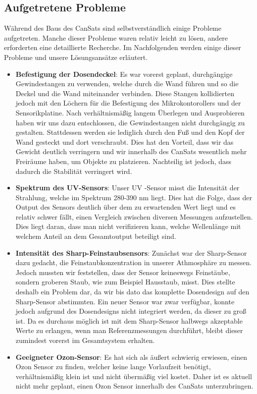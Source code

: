 \subsection{Aufgetretene Probleme}
Während des Baus des CanSats sind selbstverständlich einige Probleme aufgetreten. Manche dieser Probleme waren relativ leicht zu lösen, andere erforderten eine detaillierte Recherche. Im Nachfolgenden werden einige dieser Probleme und unsere Lösungsansätze erläutert.

\begin{itemize}
	\item \textbf{Befestigung der Dosendeckel}: Es war vorerst geplant, durchgängige Gewindestangen zu verwenden, welche durch die Wand führen und so die Deckel und die Wand miteinander verbinden. Diese Stangen kollidierten jedoch mit den Löchern für die Befestigung des Mikrokontorollers und der Sensorikplatine. Nach verhältnismäßig langem Überlegen und Ausprobieren haben wir uns dazu entschlossen, die Gewindestangen nicht durchgängig zu gestalten. Stattdessen werden sie lediglich durch den Fuß und den Kopf der Wand gesteckt und dort verschraubt. Dies hat den Vorteil, dass wir das Gewicht deutlich verringern und wir innerhalb des CanSats wesentlich mehr Freiräume haben, um Objekte zu platzieren. Nachteilig ist jedoch, dass dadurch die Stabilität verringert wird.
	\item \textbf{Spektrum des UV-Sensors}: Unser UV -Sensor misst die Intensität der Strahlung, welche im Spektrum 280-390 nm liegt. Dies hat die Folge, dass der Output des Sensors deutlich über dem zu erwartenden Wert liegt und es relativ schwer fällt, einen Vergleich zwischen diversen Messungen aufzustellen. Dies liegt daran, dass man nicht verifizieren kann, welche Wellenlänge mit welchem Anteil an dem Gesamtoutput beteiligt sind.
	\item \textbf{Intensität des Sharp-Feinstaubsensors}: Zunächst war der Sharp-Sensor dazu gedacht, die Feinstaubkonzentration in unserer Athmosphäre zu messen. Jedoch mussten wir feststellen, dass der Sensor keineswegs Feinstäube, sondern groberen Staub, wie zum Beispiel Hausstaub, misst. Dies stellte deshalb ein Problem dar, da wir bis dato das komplette Dosendesign auf den Sharp-Sensor abstimmten. Ein neuer Sensor war zwar verfügbar, konnte jedoch aufgrund des Dosendesigns nicht integriert werden, da dieser zu groß ist. Da es durchaus möglich ist mit dem Sharp-Sensor halbwegs akzeptable Werte zu erlangen, wenn man Referenzmessungen durchführt, bleibt dieser zumindest vorerst im Gesamtsystem erhalten.
	\item \textbf{Geeigneter Ozon-Sensor}: Es hat sich als äußert schwierig erwiesen, einen Ozon Sensor zu finden, welcher keine lange Vorlaufzeit benötigt, verhältnismäßig klein ist und nicht übermäßig viel kostet. Daher ist es aktuell nicht mehr geplant, einen Ozon Sensor innerhalb des CanSats unterzubringen.

\end{itemize}
